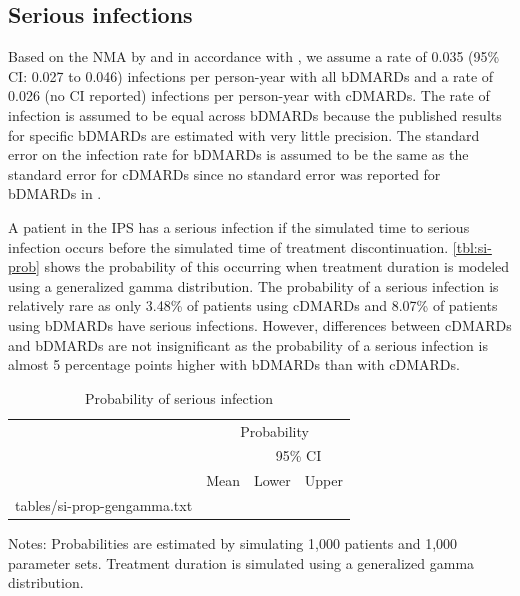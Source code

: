 \documentclass[11pt,final,fleqn]{article}\usepackage[]{graphicx}\usepackage[]{color}
\makeatletter
\theoremstyle{plain}
\newcommand*\ExpandableInput[1]{\@@input#1 }
\makeatother
\begin{document}
\subsection{Serious infections}
Based on the NMA by \citet{singh2011adverse} and in accordance with \citet{stevenson2016adalimumab}, we assume a rate of 0.035 (95\% CI: 0.027 to 0.046) infections per person-year with all bDMARDs and a rate of 0.026 (no CI reported) infections per person-year with cDMARDs. The rate of infection is assumed to be equal across bDMARDs because the published results for specific bDMARDs are estimated with very little precision. The standard error on the infection rate for bDMARDs is assumed to be the same as the standard error for cDMARDs since no standard error was reported for bDMARDs in \citet{singh2011adverse}.



A patient in the IPS has a serious infection if the simulated time to serious infection occurs before the simulated time of treatment discontinuation. \autoref{tbl:si-prob} shows the probability of this occurring when treatment duration is modeled using a generalized gamma distribution. The probability of a serious infection is relatively rare as only 3.48\% of patients using cDMARDs and 8.07\% of patients using bDMARDs have serious infections. However, differences between cDMARDs and bDMARDs are not insignificant as the probability of a serious infection is almost 5 percentage points higher with bDMARDs than with cDMARDs.

\begin{table}[!ht]
\begin{center}
\begin{threeparttable}
\caption{Probability of serious infection} \label{tbl:si-prob}
\begin{tabularx}{\textwidth}{@{\extracolsep{\fill}}lrrr}
\hline
\multicolumn{1}{l}{} & \multicolumn{3}{c}{Probability} \\
\cmidrule{2-4} 
\multicolumn{2}{l}{} & \multicolumn{2}{c}{95\% CI} \\
\cmidrule{3-4} 
\multicolumn{1}{c}{} & \multicolumn{1}{c}{Mean} & \multicolumn{1}{c}{Lower} & \multicolumn{1}{c}{Upper} \\
\hline
\ExpandableInput{tables/si-prop-gengamma.txt}
\hline
\end{tabularx}
\scriptsize
Notes: Probabilities are estimated by simulating 1,000 patients and 1,000 parameter sets. Treatment duration is simulated using a generalized gamma distribution. 
\end{threeparttable}
\end{center}
\end{table}
\end{document}

